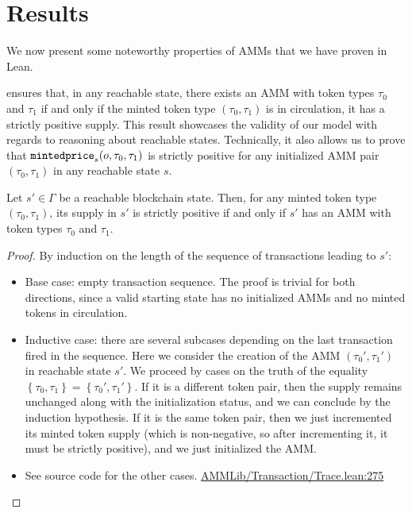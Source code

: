 \section{Results}
\label{sec:results}
We now present some noteworthy properties of AMMs that we have proven in Lean. 

 ensures that, in any reachable state, there exists an AMM with token types $\tau_0$ and $\tau_1$ if and only if the minted token type $(\tau_0, \tau_1)$ is in circulation, \ie it has a strictly positive supply.
This result showcases the validity of our model with regards to reasoning about reachable states. 
Technically, it also allows us to prove that $\code{mintedprice}_s(o, \tau_0, \tau_1)$ is strictly positive for any initialized AMM pair $(\tau_0, \tau_1)$ in any reachable state $s$.

\begin{proposition}
\label{th:ammreachable}
Let $s' \in \Gamma$ be a reachable blockchain state. 
Then, for any minted token type $\left(\tau_0, \tau_1\right)$, its supply in $s'$ is strictly positive if and only if $s'$ has an AMM with token types $\tau_0$ and $\tau_1$.
\end{proposition}
\begin{proof} By induction on the length of the sequence of transactions leading to $s'$:
\begin{itemize}
    
    \item Base case: empty transaction sequence.
    The proof is trivial for both directions, since a valid starting state has no initialized AMMs and no minted tokens in circulation.
    
    \item Inductive case: there are several subcases depending on the last transaction fired in the sequence. 
    Here we consider the creation of the AMM $(\tau_0',\tau_1')$ in reachable state $s'$.
    We proceed by cases on the truth of the equality $\left\{\tau_0, \tau_1\right\} = \left\{\tau_0', \tau_1'\right\}$. If it is a different token pair, then the supply remains unchanged along with the initialization status, and we can conclude by the induction hypothesis. If it is the same token pair, then we just incremented its minted token supply (which is non-negative, so after incrementing it, it must be strictly positive), and we just initialized the AMM.
    
    \item See source code for the other cases. \href{https://github.com/danielepusceddu/lean4-amm/blob/paper/AMMLib/Transaction/Trace.lean#L275}{AMMLib/Transaction/Trace.lean:275} 
    \qedhere
\end{itemize}
\end{proof}

